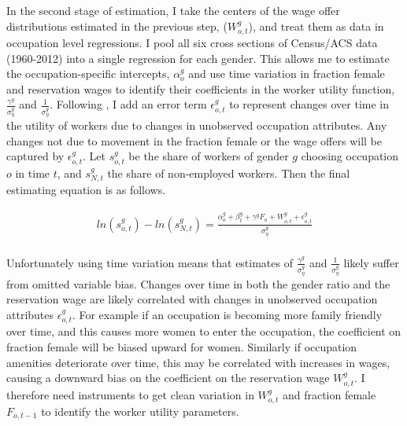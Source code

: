 \documentclass[12pt]{article}
\begin{document}

In the second stage of estimation, I take the centers of the wage offer distributions estimated in the previous step, ($W^g_{o,t}$), and treat them as data in occupation level regressions. I pool all six cross sections of Census/ACS data (1960-2012) into a single regression for each gender. This allows me to estimate the occupation-specific intercepts, $\alpha^g_o$ and use time variation in fraction female and reservation wages to identify their coefficients in the worker utility function, $\frac{\gamma^g}{\sigma^g_{\eta}}$ and $\frac{1}{\sigma^g_{\eta}}$. Following , I add an error term $\epsilon^g_{o,t}$ to represent changes over time in the utility of workers due to changes in unobserved occupation attributes. Any changes not due to movement in the fraction female or the wage offers will be captured by $\epsilon^g_{o,t}$. Let $s^g_{o,t}$ be the share of workers of gender $g$ choosing occupation $o$ in time $t$, and $s^g_{N,t}$ the share of non-employed workers. Then the final estimating equation is as follows.

\begin{align*}
ln(s^g_{o,t}) - ln(s^g_{N,t}) =   \frac{  \alpha^g_o + \beta^g_t  + \gamma^g F_{o} +  W^g_{o,t} + \epsilon^g_{o,t}}{\sigma^g_{\eta}}  \\
\end{align*}


Unfortunately using time variation means that estimates of $\frac{\gamma^g}{\sigma^g_{\eta}}$ and $\frac{1}{\sigma^g_{\eta}}$ likely suffer from omitted variable bias. Changes over time in both the gender ratio and the reservation wage are likely correlated with changes in unobserved occupation attributes $\epsilon^g_{o,t}$. For example if an occupation is becoming more family friendly over time, and this causes more women to enter the occupation, the coefficient on fraction female will be biased upward for women. Similarly if occupation amenities deteriorate over time, this may be correlated with increases in wages, causing a downward bias on the coefficient on the reservation wage $W^g_{o,t}$. I therefore need instruments to get clean variation in $W^g_{o,t}$ and fraction female $F_{o,t-1}$ to identify the worker utility parameters.
\end{document}
